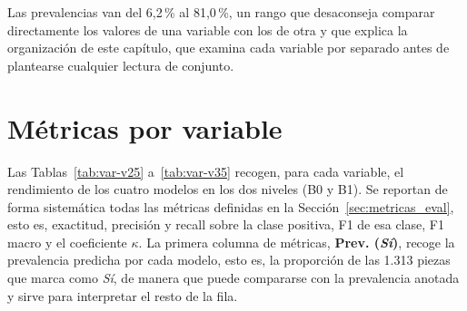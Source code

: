 \begin{table}[H]
    \centering
    \begingroup
    \small
    \endgroup
\end{table}

Las prevalencias van del 6,2\,\% al 81,0\,\%, un rango que desaconseja comparar
directamente los valores de una variable con los de otra y que explica la
organización de este capítulo, que examina cada variable por separado antes de
plantearse cualquier lectura de conjunto.


\section{Métricas por variable}
\label{subsec:iris_porvariable}

Las Tablas~\ref{tab:var-v25} a~\ref{tab:var-v35} recogen, para cada variable, el
rendimiento de los cuatro modelos en los dos niveles (B0 y B1). Se reportan de forma
sistemática todas las métricas definidas en la Sección~\ref{sec:metricas_eval},
esto es, exactitud, precisión y recall sobre la clase positiva, F1 de esa clase,
F1 macro y el coeficiente $\kappa$. La primera columna de métricas,
\textbf{Prev. (\textit{Sí})}, recoge la prevalencia predicha por cada modelo, esto es,
la proporción de las 1.313 piezas que marca como \textit{Sí}, de manera que puede
compararse con la prevalencia anotada y sirve para interpretar el resto de la fila.

